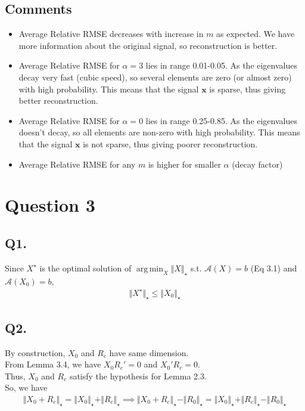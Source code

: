 \documentclass[fleqn, 11pt]{article}
\DeclareMathOperator*{\argmin}{arg\,min}
\newcommand{\bs}[1]{\boldsymbol{#1}}
\begin{document}
\medskip

\subsection*{Comments}
\begin{itemize}
    \item Average Relative RMSE decreases with increase in $m$ as expected. We have more information about the original signal, so reconstruction is better.
    \item Average Relative RMSE for $\alpha = 3$ lies in range 0.01-0.05. As the eigenvalues decay very fast (cubic speed), so several elements are zero (or almost zero) with high probability. This means that the signal $\bs{x}$ is sparse, thus giving better reconstruction.
    \item Average Relative RMSE for $\alpha = 0$ lies in range 0.25-0.85. As the eigenvalues doesn't decay, so all elements are non-zero with high probability. This means that the signal $\bs{x}$ is not sparse, thus giving poorer reconstruction.
    \item Average Relative RMSE for any $m$ is higher for smaller $\alpha$ (decay factor)
\end{itemize}


\newpage
\section*{Question 3}
\setcounter{equation}{0}

\subsection*{Q1.}
Since $X^\star$ is the optimal solution of $\argmin_X \Vert X \Vert_\star$ s.t. $\mathcal{A}(X) = b$ (Eq 3.1) and $\mathcal{A}(X_0) = b$,
\begin{equation*}
    \begin{aligned}
        \Vert X^\star \Vert_\star \le \Vert X_0 \Vert_\star
    \end{aligned}
\end{equation*}

\subsection*{Q2.}
By construction, $X_0$ and $R_c$ have same dimension. \\
From Lemma 3.4, we have $X_0 R_c' = 0$ and $X_0' R_c = 0$. \\
Thus, $X_0$ and $R_c$ satisfy the hypothesis for Lemma 2.3. \\
So, we have
\begin{equation*}
    \begin{aligned}
        \Vert X_0 + R_c \Vert_\star = \Vert X_0 \Vert_\star + \Vert R_c \Vert_\star \implies \Vert X_0 + R_c \Vert_\star - \Vert R_0 \Vert_\star = \Vert X_0 \Vert_\star + \Vert R_c \Vert_\star - \Vert R_0 \Vert_\star
    \end{aligned}
\end{equation*}
\end{document}
